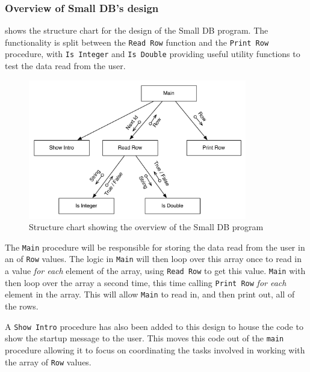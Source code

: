 \clearpage
\subsubsection{Overview of Small DB's design} %
\label{ssub:overview_of_small_db_s_design}

 shows the structure chart for the design of the Small DB program. The functionality is split between the \texttt{Read Row} function and the \texttt{Print Row} procedure, with \texttt{Is Integer} and \texttt{Is Double} providing useful utility functions to test the data read from the user.

\begin{figure}[htbp]
   \centering
   \includegraphics[width=0.85\textwidth]{./topics/type-decl/diagrams/SmallDBStruct} 
   \caption{Structure chart showing the overview of the Small DB program}
   \label{fig:small-db-struct}
\end{figure}

The \texttt{Main} procedure will be responsible for storing the data read from the user in an  of \texttt{Row} values. The logic in \texttt{Main} will then loop over this array once to read in a value \emph{for each} element of the array, using \texttt{Read Row} to get this value. \texttt{Main} with then loop over the array a second time, this time calling \texttt{Print Row} \emph{for each} element in the array. This will allow \texttt{Main} to read in, and then print out, all of the rows.

A \texttt{Show Intro} procedure has also been added to this design to house the code to show the startup message to the user. This moves this code out of the \texttt{main} procedure allowing it to focus on coordinating the tasks involved in working with the array of \texttt{Row} values.

